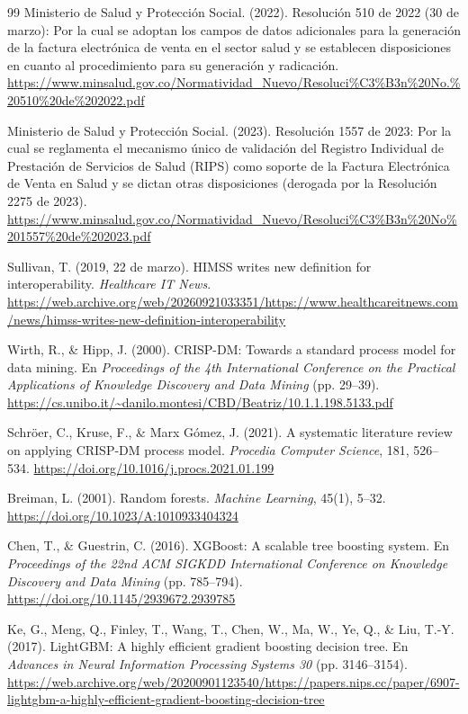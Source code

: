 \documentclass[12pt,letterpaper]{report}
\begin{document}
\begin{thebibliography}{99}
Ministerio de Salud y Protección Social. (2022). Resolución 510 de 2022 (30 de marzo): Por la cual se adoptan los campos de datos adicionales para la generación de la factura electrónica de venta en el sector salud y se establecen disposiciones en cuanto al procedimiento para su generación y radicación. \url{https://www.minsalud.gov.co/Normatividad_Nuevo/Resoluci%C3%B3n%20No.%20510%20de%202022.pdf}

Ministerio de Salud y Protección Social. (2023). Resolución 1557 de 2023: Por la cual se reglamenta el mecanismo único de validación del Registro Individual de Prestación de Servicios de Salud (RIPS) como soporte de la Factura Electrónica de Venta en Salud y se dictan otras disposiciones (derogada por la Resolución 2275 de 2023). \url{https://www.minsalud.gov.co/Normatividad_Nuevo/Resoluci%C3%B3n%20No%201557%20de%202023.pdf}

Sullivan, T. (2019, 22 de marzo). HIMSS writes new definition for interoperability. \textit{Healthcare IT News}. \url{https://web.archive.org/web/20260921033351/https://www.healthcareitnews.com/news/himss-writes-new-definition-interoperability}

Wirth, R., \& Hipp, J. (2000). CRISP-DM: Towards a standard process model for data mining. En \textit{Proceedings of the 4th International Conference on the Practical Applications of Knowledge Discovery and Data Mining} (pp. 29--39). \url{https://cs.unibo.it/~danilo.montesi/CBD/Beatriz/10.1.1.198.5133.pdf}

Schröer, C., Kruse, F., \& Marx Gómez, J. (2021). A systematic literature review on applying CRISP-DM process model. \textit{Procedia Computer Science}, 181, 526--534. \url{https://doi.org/10.1016/j.procs.2021.01.199}

Breiman, L. (2001). Random forests. \textit{Machine Learning}, 45(1), 5--32. \url{https://doi.org/10.1023/A:1010933404324}

Chen, T., \& Guestrin, C. (2016). XGBoost: A scalable tree boosting system. En \textit{Proceedings of the 22nd ACM SIGKDD International Conference on Knowledge Discovery and Data Mining} (pp. 785--794). \url{https://doi.org/10.1145/2939672.2939785}

Ke, G., Meng, Q., Finley, T., Wang, T., Chen, W., Ma, W., Ye, Q., \& Liu, T.-Y. (2017). LightGBM: A highly efficient gradient boosting decision tree. En \textit{Advances in Neural Information Processing Systems 30} (pp. 3146--3154). \url{https://web.archive.org/web/20200901123540/https://papers.nips.cc/paper/6907-lightgbm-a-highly-efficient-gradient-boosting-decision-tree}


\end{thebibliography}
\end{document}
